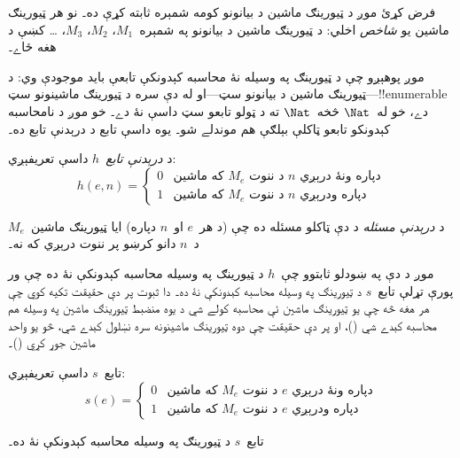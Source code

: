 \documentclass[../../../include/open-logic-section]{subfiles}
\begin{document}

\begin{explain}
فرض کړئ موږ د ټيورينګ ماشين د بيانونو کومه شمېره ثابته کړې ده۔ نو
هر ټيورينګ ماشين يو \emph{شاخص} اخلي: د ټيورينګ ماشين د بيانونو په
شمېره~$M_1$، $M_2$، $M_3$، \dots{} کښې د هغه ځاے۔

موږ پوهېږو چې د ټيورينګ په وسيله نۀ محاسبه کېدونکې تابعې بايد موجودې
وي: د ټيورينګ ماشين د بيانونو سټ---او له دې سره د ټيورينګ ماشينونو
سټ---!!{enumerable} دے، خو له~$\Nat$ څخه~$\Nat$ ته د ټولو تابعو سټ
داسې نۀ دے۔ خو موږ د نامحاسبه کېدونکو تابعو ټاکلې بېلګې هم موندلے
شو۔ يوه داسې تابع د درېدنې تابع ده۔
\end{explain}

\begin{defn}
 د \emph{درېدنې تابع}~$h$ داسې تعريفېږي:
\[
h(e,n) =
\begin{cases}
  \text{0} & \text{که ماشين~$M_e$ د ننوت $n$ دپاره ونۀ درېږي} \\
  \text{1} & \text{که ماشين~$M_e$ د ننوت $n$ دپاره ودرېږي}
\end{cases}
\]
\end{defn}

\begin{defn}
د \emph{درېدنې مسئله} د دې ټاکلو مسئله ده چې (د هر~$e$ او~$n$ دپاره)
ايا ټيورينګ ماشين~$M_e$ د~$n$ دانو کرښو پر ننوت درېږي که نه۔
\end{defn}

\begin{explain}
موږ د دې په ښودلو ثابتوو چې~$h$ د ټيورينګ په وسيله محاسبه کېدونکې
نۀ ده چې ور پورې تړلې تابع~$s$ د ټيورينګ په وسيله محاسبه کېدونکې
نۀ ده۔ دا ثبوت پر دې حقيقت تکيه کوي چې هر هغه څه چې يو ټيورينګ ماشين
ئې محاسبه کولے شي د يوه منضبط ټيورينګ ماشين په وسيله هم محاسبه کېدے
شي ()، او پر دې حقيقت چې دوه ټيورينګ ماشينونه
سره نښلول کېدے شي، څو يو واحد ماشين جوړ کړي ()۔
\end{explain}

\begin{defn} تابع~$s$ داسې تعريفېږي:
\[
s(e) =
\begin{cases}
  \text{0} & \text{که ماشين~$M_e$ د ننوت $e$ دپاره ونۀ درېږي} \\
  \text{1} & \text{که ماشين~$M_e$ د ننوت $e$ دپاره ودرېږي}
\end{cases}
\]
\end{defn}

\begin{lem}
تابع~$s$ د ټيورينګ په وسيله محاسبه کېدونکې نۀ ده۔
\end{lem}
\end{document}

